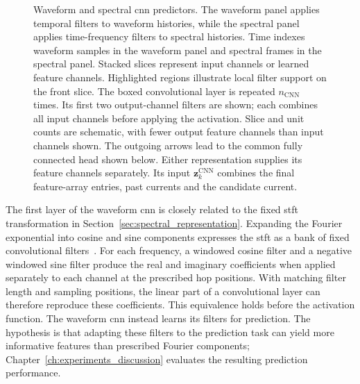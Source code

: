 \begin{figure}
    \centering
    
    \caption{Waveform and spectral \ac{cnn} predictors.
    The waveform panel applies temporal filters to waveform histories, while the spectral panel applies time-frequency filters to spectral histories.
    Time indexes waveform samples in the waveform panel and spectral frames in the spectral panel.
    Stacked slices represent input channels or learned feature channels.
    Highlighted regions illustrate local filter support on the front slice.
    The boxed convolutional layer is repeated $n_{\mathrm{CNN}}$ times.
    Its first two output-channel filters are shown; each combines all input channels before applying the activation.
    Slice and unit counts are schematic, with fewer output feature channels than input channels shown.
    The outgoing arrows lead to the common fully connected head shown below.
    Either representation supplies its feature channels separately.
    Its input $\mathbf{z}_k^{\mathrm{CNN}}$ combines the final feature-array entries, past currents and the candidate current.}\label{fig:cnn_architecture}
\end{figure}

The first layer of the waveform \ac{cnn} is closely related to the fixed \ac{stft} transformation in Section~\ref{sec:spectral_representation}.
Expanding the Fourier exponential into cosine and sine components expresses the \ac{stft} as a bank of fixed convolutional filters~\cite{Oppenheim2010}.
For each frequency, a windowed cosine filter and a negative windowed sine filter produce the real and imaginary coefficients when applied separately to each channel at the prescribed hop positions.
With matching filter length and sampling positions, the linear part of a convolutional layer can therefore reproduce these coefficients.
This equivalence holds before the activation function.
The waveform \ac{cnn} instead learns its filters for prediction.
The hypothesis is that adapting these filters to the prediction task can yield more informative features than prescribed Fourier components; Chapter~\ref{ch:experiments_discussion} evaluates the resulting prediction performance.

